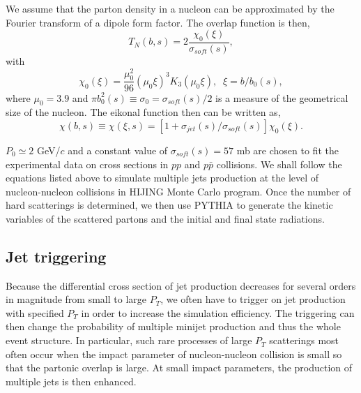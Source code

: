 We assume that the parton density in a nucleon can be 
approximated  by the Fourier transform of a dipole form factor. 
The overlap function is then,
\begin{equation}
        T_N(b,s)=2\frac{\chi_0(\xi)}{\sigma_{soft}(s)},\label{eq:over1}
\end{equation}
with
\begin{equation} 
        \chi_0(\xi)=\frac{\mu_0^2}{96}(\mu_0 \xi)^3 K_3(\mu_0 \xi),
                \;\; \xi=b/b_0(s),\label{eq:over2}
\end{equation}
where $\mu_0=3.9$ and $\pi b_0^2(s)\equiv\sigma_0=\sigma_{soft}(s)/2$ 
is a measure of the geometrical size of the nucleon. The 
eikonal function then can be written as,
\begin{equation}
        \chi(b,s)\equiv\chi(\xi,s)
        =[1+\sigma_{jet}(s)/\sigma_{soft}(s)]\chi_0(\xi).
\end{equation}

        $P_0\simeq 2$ GeV/$c$ and a constant value of 
$\sigma_{soft}(s)=57$ mb are chosen to fit the experimental
data on cross sections\cite{wang91a} in $pp$ and $p\bar{p}$ 
collisions. We shall follow the equations listed above to simulate 
multiple jets production at the level of nucleon-nucleon 
collisions in HIJING Monte Carlo program. Once the number
of hard scatterings is determined, we then use PYTHIA to generate 
the kinetic variables of the scattered partons and the initial
and final state radiations. 

\subsection{Jet triggering}
\label{sec:jet2}


Because the differential cross section of jet production 
decreases for several orders in magnitude from small to 
large $P_T$, we often have to trigger on jet production 
with specified $P_T$ in order to increase the simulation
efficiency. The triggering can then change the probability
of multiple minijet production and thus the whole event
structure. In particular, such rare processes of large
$P_T$ scatterings most often occur when the impact 
parameter of nucleon-nucleon collision is small so that
the partonic overlap is large. At small impact parameters,
the production of multiple jets is then enhanced.

